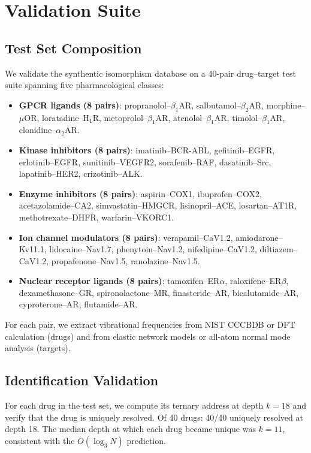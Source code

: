 \documentclass[11pt,twocolumn,a4paper]{article}
\theoremstyle{definition}
\theoremstyle{remark}
\begin{document}
\section{Validation Suite}
\label{sec:validation}

\subsection{Test Set Composition}

We validate the synthentic isomorphism database on a 40-pair drug--target test suite spanning five pharmacological classes:

\begin{itemize}[nosep,leftmargin=*]
\item \textbf{GPCR ligands (8 pairs)}: propranolol--$\beta_1$AR, salbutamol--$\beta_2$AR, morphine--$\mu$OR, loratadine--H$_1$R, metoprolol--$\beta_1$AR, atenolol--$\beta_1$AR, timolol--$\beta_1$AR, clonidine--$\alpha_2$AR.
\item \textbf{Kinase inhibitors (8 pairs)}: imatinib--BCR-ABL, gefitinib--EGFR, erlotinib--EGFR, sunitinib--VEGFR2, sorafenib--RAF, dasatinib--Src, lapatinib--HER2, crizotinib--ALK.
\item \textbf{Enzyme inhibitors (8 pairs)}: aspirin--COX1, ibuprofen--COX2, acetazolamide--CA2, simvastatin--HMGCR, lisinopril--ACE, losartan--AT1R, methotrexate--DHFR, warfarin--VKORC1.
\item \textbf{Ion channel modulators (8 pairs)}: verapamil--CaV1.2, amiodarone--Kv11.1, lidocaine--Nav1.7, phenytoin--Nav1.2, nifedipine--CaV1.2, diltiazem--CaV1.2, propafenone--Nav1.5, ranolazine--Nav1.5.
\item \textbf{Nuclear receptor ligands (8 pairs)}: tamoxifen--ER$\alpha$, raloxifene--ER$\beta$, dexamethasone--GR, spironolactone--MR, finasteride--AR, bicalutamide--AR, cyproterone--AR, flutamide--AR.
\end{itemize}

For each pair, we extract vibrational frequencies from NIST CCCBDB or DFT calculation (drugs) and from elastic network models or all-atom normal mode analysis (targets).

\subsection{Identification Validation}

For each drug in the test set, we compute its ternary address at depth $k = 18$ and verify that the drug is uniquely resolved. Of 40 drugs: 40/40 uniquely resolved at depth 18. The median depth at which each drug became unique was $k = 11$, consistent with the $O(\log_3 N)$ prediction.
\end{document}
